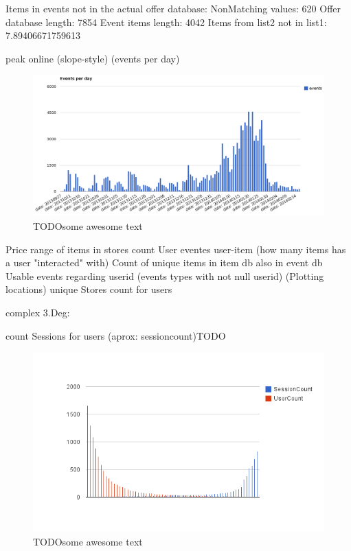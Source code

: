         Items in events not in the actual offer database:
        NonMatching values:             620
        Offer database length:          7854
        Event items length:             4042
        Items from list2 not in list1:  7.89406671759613


        peak online (slope-style) (events per day)


\begin{figure}[H]
    \includegraphics[width=5in]{image/events_per_day.png}
    \centering
    \caption[Distribution of events per day]{TODOsome awesome text}
    \label{figure:ratingdistr}
\end{figure}

        Price range of items in stores
        count User eventes
        user-item (how many items has a user "interacted" with)
        Count of unique items in item db also in event db
        Usable events regarding userid (events types with not null userid)
        (Plotting locations)
        unique Stores count for users

    complex 3.Deg:

        count Sessions for users (aprox: sessioncount)TODO

\begin{figure}[H]
    \includegraphics[width=5in]{image/global_sessioncount.png}
    \centering
    \caption[Count of sessions per user mapped with count of user with give
    session amount]{TODOsome awesome text}
    \label{figure:ratingdistr}
\end{figure}

